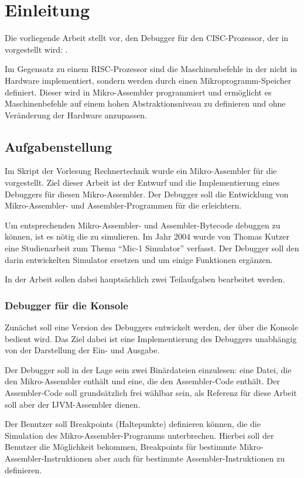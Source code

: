 \chapter*{Einleitung}
Die vorliegende Arbeit stellt \md vor, den Debugger für den CISC-Prozessor, der in \cite{Tanenbaum1998} vorgestellt wird: \mic.

Im Gegensatz zu einem RISC-Prozessor sind die Maschinenbefehle in der \mic nicht in Hardware implementiert, sondern werden durch einen Mikroprogramm-Speicher definiert. Dieser wird in Mikro-Assembler programmiert und ermöglicht es Maschinenbefehle auf einem hohen Abstraktionsniveau zu definieren und ohne Veränderung der Hardware anzupassen.

\section*{Aufgabenstellung}
Im Skript der Vorlesung Rechnertechnik  wurde ein Mikro-Assembler für die \mic vorgestellt. Ziel dieser Arbeit ist der Entwurf und die Implementierung eines Debuggers für diesen Mikro-Assembler. Der Debugger soll die Entwicklung von Mikro-Assembler- und Assembler-Programmen für die \mic erleichtern.

Um entsprechenden Mikro-Assembler- und Assembler-Bytecode debuggen zu können, ist es nötig die \mic zu simulieren. Im Jahr 2004 wurde von Thomas Kutzer eine Studienarbeit zum Thema ``Mic-1 Simulator'' verfasst. Der Debugger soll den darin entwickelten Simulator ersetzen und um einige Funktionen ergänzen.

In der Arbeit sollen dabei hauptsächlich zwei Teilaufgaben bearbeitet werden.

\subsection*{Debugger für die Konsole}
Zunächst soll eine Version des Debuggers entwickelt werden, der über die Konsole bedient wird. Das Ziel dabei ist eine Implementierung des Debuggers unabhängig von der Darstellung der Ein- und Ausgabe.

Der Debugger soll in der Lage sein zwei Binärdateien einzulesen: eine Datei, die den Mikro-Assembler enthält und eine, die den Assembler-Code enthält. Der Assembler-Code soll grundsätzlich frei wählbar sein, als Referenz für diese Arbeit soll aber der IJVM-Assembler dienen.

Der Benutzer soll Breakpoints (Haltepunkte) definieren können, die die Simulation des Mikro-Assembler-Programms unterbrechen. Hierbei soll der Benutzer die Möglichkeit bekommen, Breakpoints für bestimmte Mikro-Assembler-Instruktionen aber auch für bestimmte Assembler-Instruktionen zu definieren.

